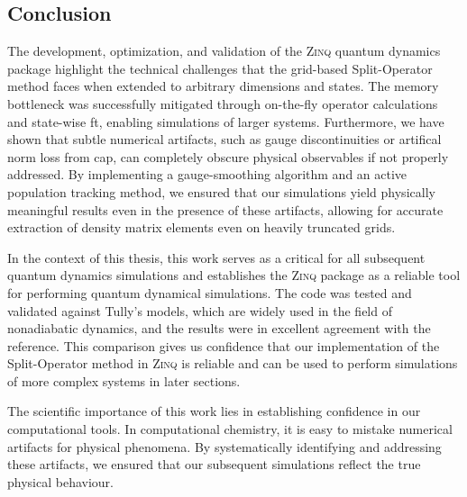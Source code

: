 \subsection{Conclusion}
The development, optimization, and validation of the \textsc{Zinq} quantum dynamics package highlight the technical challenges that the grid-based Split-Operator method faces when extended to arbitrary dimensions and states. The memory bottleneck was successfully mitigated through on-the-fly operator calculations and state-wise \gls{ft}, enabling simulations of larger systems. Furthermore, we have shown that subtle numerical artifacts, such as gauge discontinuities or artifical norm loss from \gls{cap}, can completely obscure physical observables if not properly addressed. By implementing a gauge-smoothing algorithm and an active population tracking method, we ensured that our simulations yield physically meaningful results even in the presence of these artifacts, allowing for accurate extraction of density matrix elements even on heavily truncated grids.

In the context of this thesis, this work serves as a critical for all subsequent quantum dynamics simulations and establishes the \textsc{Zinq} package as a reliable tool for performing quantum dynamical simulations. The code was tested and validated against Tully's models, which are widely used in the field of nonadiabatic dynamics, and the results were in excellent agreement with the reference. This comparison gives us confidence that our implementation of the Split-Operator method in \textsc{Zinq} is reliable and can be used to perform simulations of more complex systems in later sections.

The scientific importance of this work lies in establishing confidence in our computational tools. In computational chemistry, it is easy to mistake numerical artifacts for physical phenomena. By systematically identifying and addressing these artifacts, we ensured that our subsequent simulations reflect the true physical behaviour.
